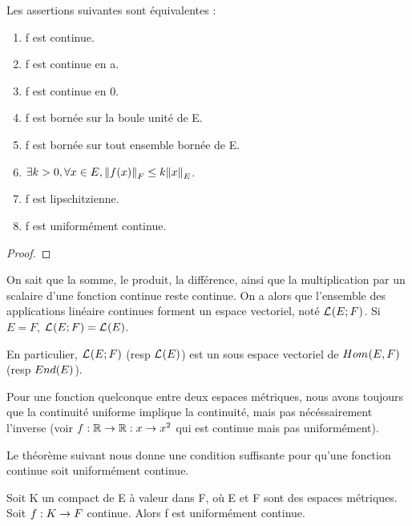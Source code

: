 \begin{proposition}
	Les assertions suivantes sont équivalentes :

	\begin{enumerate}
		\item f est continue.
		\item f est continue en a.
		\item f est continue en 0.
		\item f est bornée sur la boule unité de E.
		\item f est bornée sur tout ensemble bornée de E.
		\item $\exists k > 0, \forall x \in E, \norm{f(x)}_{F} \leq k
			\norm{x}_{E}$.
		\item f est lipschitzienne.
		\item f est uniformément continue.
	\end{enumerate}
\end{proposition}

\ifdefined\outputproof
\begin{proof}

\end{proof}
\fi

On sait que la somme, le produit, la différence, ainsi que la multiplication par
un scalaire d'une fonction continue reste continue. On a alors que l'ensemble
des applications linéaire continues forment un espace vectoriel, noté
$\mathcal{L}_{}(E; F)$. Si $E = F$, $\mathcal{L}_{}(E; F) =
\mathcal{L}_{}(E)$.

En particulier, $\mathcal{L}_{}(E; F)$ (resp $\mathcal{L}_{}(E)$) est un sous
espace vectoriel de $Hom_{}(E, F)$ (resp $End(E)$).

\begin{remarque}
	Pour une fonction quelconque entre deux espaces métriques, nous avons
	toujours que la continuité uniforme implique la continuité, mais pas
	nécéssairement l'inverse (voir $f : 
\mathbb{R} \rightarrow 
\mathbb{R} : x \rightarrow x^2$ qui est continue mais pas uniformément).
\end{remarque}

Le théorème suivant nous donne une condition suffisante pour qu'une fonction
continue soit uniformément continue.

\begin{theorem} [Heine]
	Soit K un compact de E à valeur dans F, où E et F sont des espaces
	métriques. Soit $f : K \rightarrow F$ continue. Alors f est uniformément
	continue.
	\label{Heine}
\end{theorem}

